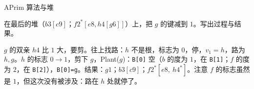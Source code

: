 \begin{exercises}{A}{Prim 算法与堆}
\item\label{ex:mst-prim:A4} 在最后的堆（$b3[c9]$；$f2^*[e8,h4[g6]]$）上，把 $g$ 的键减到 $1$。写出过程与结果。
\begin{solution}
$g$ 的双亲 $h4$ 比 $1$ 大，要剪。往上找路：$h$ 不是根，标志为 $0$，停，$v_1=h$，路为 $h,g$。$h$ 的标志 $0\to1$，剪下 $g$，Plant($g$)：\texttt{B[0]} 空（$b$ 的度为 $1$，在 \texttt{B[1]}；$f$ 的度为 $2$，在 \texttt{B[2]}），\texttt{B[0]=g}。结果：$g1$；$b3[c9]$；$f2^*[e8,\ h4^*]$。注意 $f$ 的标志虽然是 $1$，但这次没有被涉及：路在 $h$ 处就停了。
\end{solution}
\end{exercises}
